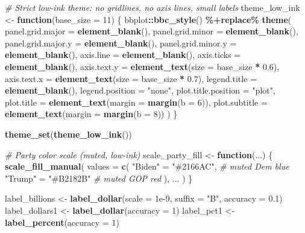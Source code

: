 \documentclass[
  11pt,
]{article}
\newenvironment{Shaded}{\begin{snugshade}}{\end{snugshade}}
\newcommand{\AttributeTok}[1]{\textcolor[rgb]{0.13,0.29,0.53}{#1}}
\newcommand{\CommentTok}[1]{\textcolor[rgb]{0.56,0.35,0.01}{\textit{#1}}}
\newcommand{\ControlFlowTok}[1]{\textcolor[rgb]{0.13,0.29,0.53}{\textbf{#1}}}
\newcommand{\DecValTok}[1]{\textcolor[rgb]{0.00,0.00,0.81}{#1}}
\newcommand{\FloatTok}[1]{\textcolor[rgb]{0.00,0.00,0.81}{#1}}
\newcommand{\FunctionTok}[1]{\textcolor[rgb]{0.13,0.29,0.53}{\textbf{#1}}}
\newcommand{\NormalTok}[1]{#1}
\newcommand{\OtherTok}[1]{\textcolor[rgb]{0.56,0.35,0.01}{#1}}
\newcommand{\SpecialCharTok}[1]{\textcolor[rgb]{0.81,0.36,0.00}{\textbf{#1}}}
\newcommand{\StringTok}[1]{\textcolor[rgb]{0.31,0.60,0.02}{#1}}
\begin{document}
\begin{Shaded}
\begin{Highlighting}[]
\CommentTok{\# Strict low{-}ink theme: no gridlines, no axis lines, small labels}
\NormalTok{theme\_low\_ink }\OtherTok{\textless{}{-}} \ControlFlowTok{function}\NormalTok{(}\AttributeTok{base\_size =} \DecValTok{11}\NormalTok{) \{}
\NormalTok{  bbplot}\SpecialCharTok{::}\FunctionTok{bbc\_style}\NormalTok{() }\SpecialCharTok{\%+replace\%} \FunctionTok{theme}\NormalTok{(}
    \AttributeTok{panel.grid.major =} \FunctionTok{element\_blank}\NormalTok{(),}
    \AttributeTok{panel.grid.minor =} \FunctionTok{element\_blank}\NormalTok{(),}
    \AttributeTok{panel.grid.major.y =} \FunctionTok{element\_blank}\NormalTok{(),}
    \AttributeTok{panel.grid.minor.y =} \FunctionTok{element\_blank}\NormalTok{(),}
    \AttributeTok{axis.line =} \FunctionTok{element\_blank}\NormalTok{(),}
    \AttributeTok{axis.ticks =} \FunctionTok{element\_blank}\NormalTok{(),}
    \AttributeTok{axis.text.y =} \FunctionTok{element\_text}\NormalTok{(}\AttributeTok{size =}\NormalTok{ base\_size }\SpecialCharTok{*} \FloatTok{0.6}\NormalTok{),}
    \AttributeTok{axis.text.x =} \FunctionTok{element\_text}\NormalTok{(}\AttributeTok{size =}\NormalTok{ base\_size }\SpecialCharTok{*} \FloatTok{0.7}\NormalTok{),}
    \AttributeTok{legend.title =} \FunctionTok{element\_blank}\NormalTok{(),}
    \AttributeTok{legend.position =} \StringTok{"none"}\NormalTok{,}
    \AttributeTok{plot.title.position =} \StringTok{"plot"}\NormalTok{,}
    \AttributeTok{plot.title =} \FunctionTok{element\_text}\NormalTok{(}\AttributeTok{margin =} \FunctionTok{margin}\NormalTok{(}\AttributeTok{b =} \DecValTok{6}\NormalTok{)),}
    \AttributeTok{plot.subtitle =} \FunctionTok{element\_text}\NormalTok{(}\AttributeTok{margin =} \FunctionTok{margin}\NormalTok{(}\AttributeTok{b =} \DecValTok{8}\NormalTok{))}
\NormalTok{  )}
\NormalTok{\}}

\FunctionTok{theme\_set}\NormalTok{(}\FunctionTok{theme\_low\_ink}\NormalTok{())}

\CommentTok{\# Party color scale (muted, low{-}ink)}
\NormalTok{scale\_party\_fill }\OtherTok{\textless{}{-}} \ControlFlowTok{function}\NormalTok{(...) \{}
  \FunctionTok{scale\_fill\_manual}\NormalTok{(}
    \AttributeTok{values =} \FunctionTok{c}\NormalTok{(}
      \StringTok{"Biden"} \OtherTok{=} \StringTok{"\#2166AC"}\NormalTok{,  }\CommentTok{\# muted Dem blue}
      \StringTok{"Trump"} \OtherTok{=} \StringTok{"\#B2182B"}   \CommentTok{\# muted GOP red}
\NormalTok{    ),}
\NormalTok{    ...}
\NormalTok{  )}
\NormalTok{\}}

\NormalTok{label\_billions }\OtherTok{\textless{}{-}} \FunctionTok{label\_dollar}\NormalTok{(}\AttributeTok{scale =} \FloatTok{1e{-}9}\NormalTok{, }\AttributeTok{suffix =} \StringTok{"B"}\NormalTok{, }\AttributeTok{accuracy =} \FloatTok{0.1}\NormalTok{)}
\NormalTok{label\_dollars1 }\OtherTok{\textless{}{-}} \FunctionTok{label\_dollar}\NormalTok{(}\AttributeTok{accuracy =} \DecValTok{1}\NormalTok{)}
\NormalTok{label\_pct1 }\OtherTok{\textless{}{-}} \FunctionTok{label\_percent}\NormalTok{(}\AttributeTok{accuracy =} \DecValTok{1}\NormalTok{)}
\end{Highlighting}
\end{Shaded}
\end{document}
